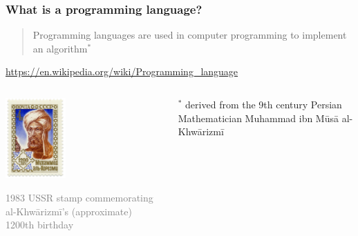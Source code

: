 \documentclass[xcolor=x11names,handout]{beamer}
\newcommand{\light}[1]{\textcolor{gray}{#1}}
\begin{document}
\begin{frame}
\frametitle{What is a programming language?}

\begin{quote}
Programming languages are used in computer programming to implement an 
\alert{algorithm}$^*$
\end{quote}
\begin{flushright}
\footnotesize
 \light{\url{https://en.wikipedia.org/wiki/Programming_language}}
\end{flushright}
\pause 

\begin{columns}
\begin{column}{0.4\textwidth}
\begin{center}
\includegraphics[width=23mm]{img/1983_CPA_5426.png}
\end{center}
\footnotesize
\light{1983 USSR stamp commemorating al-Khwārizmī's (approximate) 1200th 
birthday}
\end{column}

\begin{column}{0.55\textwidth}

$^*$ derived from the 9th century Persian Mathematician Muhammad ibn Mūsā 
al-Khwārizmī
\vspace{10mm}
\end{column}
\end{columns}
\end{frame}
\end{document}
